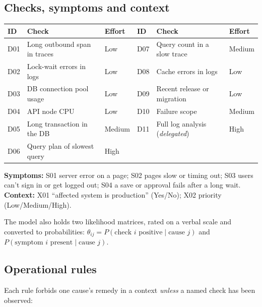 \documentclass[11pt,a4paper]{article}
\begin{document}
\subsection{Checks, symptoms and context}

\begin{center}\small
\begin{tabular}{@{}lll@{\hspace{1.5em}}lll@{}}
\toprule
ID & Check & Effort & ID & Check & Effort\\
\midrule
D01 & Long outbound span in traces & Low & D07 & Query count in a slow trace & Medium\\
D02 & Lock-wait errors in logs & Low & D08 & Cache errors in logs & Low\\
D03 & DB connection pool usage & Low & D09 & Recent release or migration & Low\\
D04 & API node CPU & Low & D10 & Failure scope & Medium\\
D05 & Long transaction in the DB & Medium & D11 & Full log analysis (\emph{delegated}) & High\\
D06 & Query plan of slowest query & High & & & \\
\bottomrule
\end{tabular}
\end{center}

\textbf{Symptoms:} S01 server error on a page; S02 pages slow or timing out; S03 users can't sign
in or get logged out; S04 a save or approval fails after a long wait.
\textbf{Context:} X01 ``affected system is production'' (Yes/No); X02 priority (Low/Medium/High).

The model also holds two likelihood matrices, rated on a verbal scale and converted to
probabilities: $\theta_{ij} = P(\text{check } i \text{ positive}\mid\text{cause } j)$ and
$P(\text{symptom } i \text{ present}\mid\text{cause } j)$.

\subsection{Operational rules}

Each rule forbids one cause's remedy in a context \emph{unless} a named check has been observed:
\end{document}
